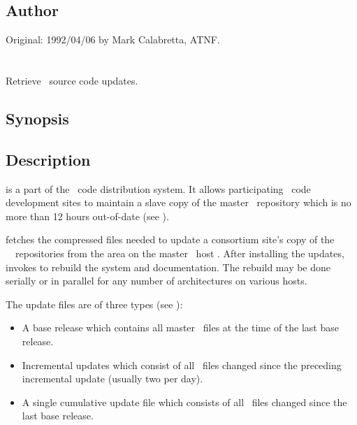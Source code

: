 \subsection*{Author}

Original: 1992/04/06 by Mark Calabretta, ATNF.


\newpage
\section{}
\label{inhale}

Retrieve \aipspp\ source code updates.

\subsection*{Synopsis}

\begin{synopsis}
\end{synopsis}

\subsection*{Description}

 is a part of the \aipspp\ code distribution system.  It allows
participating \aipspp\ code development sites to maintain a slave copy of
the master \rcs\ repository which is no more than 12 hours out-of-date
(see ).

 fetches the compressed  files needed to update a
consortium site's copy of the \aipspp\ \rcs\ repositories from the
 area on the master \aipspp\ host .
After installing the updates,  invokes  to rebuild
the system and documentation.  The rebuild may be done serially or in parallel
for any number of \aipspp architectures on various hosts.

The update files are of three types (see ):

\begin{itemize}
\item
   A base release which contains all master \rcs\ files at the time of the
   last base release.

\item
   Incremental updates which consist of all \rcs\ files changed since the
   preceding incremental update (usually two per day).

\item
   A single cumulative update file which consists of all \rcs\ files
   changed since the last base release.
\end{itemize}

